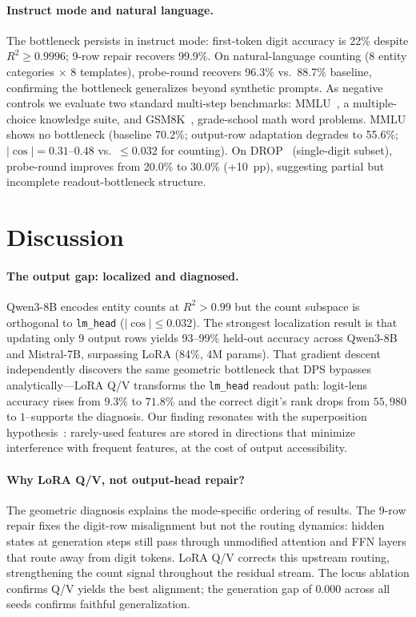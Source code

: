 \documentclass{article}
\begin{document}
\paragraph{Instruct mode and natural language.}
The bottleneck persists in instruct mode: first-token digit accuracy is 22\%
despite $R^2 \geq 0.9996$; 9-row repair recovers 99.9\%. On natural-language
counting (8 entity categories $\times$ 8 templates), probe-round recovers
96.3\% vs.\ 88.7\% baseline, confirming the bottleneck generalizes beyond
synthetic prompts. As negative controls we evaluate two standard multi-step
benchmarks: MMLU~\citep{hendrycks2021measuring}, a multiple-choice knowledge
suite, and GSM8K~\citep{cobbe2021training}, grade-school math word problems.
MMLU shows no bottleneck (baseline 70.2\%; output-row
adaptation degrades to 55.6\%; $|\cos| = 0.31$--$0.48$ vs.\ $\leq 0.032$ for
counting). On DROP~\citep{dua2019drop} (single-digit subset), probe-round improves from 20.0\% to
30.0\% (+10~pp), suggesting partial but incomplete readout-bottleneck structure.

\section{Discussion}
\label{sec:discussion}

\paragraph{The output gap: localized and diagnosed.}
Qwen3-8B encodes entity counts at $R^2>0.99$ but the count subspace is
orthogonal to \texttt{lm\_head} ($|\cos| \leq 0.032$). The strongest
localization result is that updating only 9 output rows yields 93--99\%
held-out accuracy across Qwen3-8B and Mistral-7B, surpassing LoRA (84\%, 4M
params). That gradient descent independently discovers the same geometric
bottleneck that DPS bypasses analytically---LoRA Q/V transforms the
\texttt{lm\_head} readout path: logit-lens accuracy rises from $9.3\%$ to
$71.8\%$ and the correct digit's rank drops from $55{,}980$ to
$1$\---supports the diagnosis. Our finding resonates with the superposition
hypothesis~\citep{elhage2022superposition}: rarely-used features are stored in
directions that minimize interference with frequent features, at the cost of
output accessibility.

\paragraph{Why LoRA Q/V, not output-head repair?}
The geometric diagnosis explains the mode-specific ordering of results. The
9-row repair fixes the digit-row misalignment but not the routing dynamics:
hidden states at generation steps still pass through unmodified attention and
FFN layers that route away from digit tokens. LoRA Q/V corrects this upstream
routing, strengthening the count signal throughout the residual stream. The
locus ablation confirms Q/V yields the best alignment; the generation gap of
0.000 across all seeds confirms faithful generalization.
\end{document}
